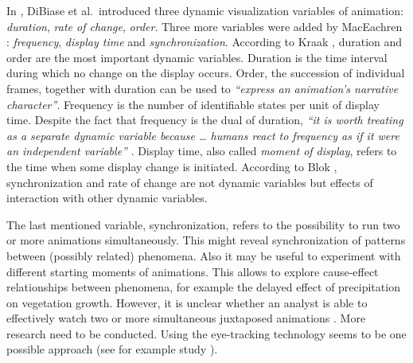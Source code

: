 \documentclass[a4paper,12pt]{book}
\begin{document}

In \cite{dibiase1992animation}, DiBiase et al.\ introduced three dynamic visualization variables of animation:
\emph{duration}, \emph{rate of change}, \emph{order}.
Three more variables were added by MacEachren \cite{maceachren2004maps}:
\emph{frequency}, \emph{display time} and \emph{synchronization}.
According to Kraak \cite{kraak2000visualisation}, duration and order are the most important
dynamic variables. Duration is the time interval during which no change on the display occurs.
Order, the succession of individual frames, together with duration can be used to
\emph{``express an animation's narrative character''}\cite{kraak2000visualisation}.
Frequency is the number of identifiable states per unit of display time.
Despite the fact that frequency is the dual of duration,
\emph{``it is worth treating as a separate dynamic variable because \ldots
humans react to frequency as if it were an independent variable''} \cite{kraak1994visualization}.
Display time, also called \emph{moment of display}, refers to the time when some display change is initiated.
According to Blok  \cite{blok2005dynamic}, synchronization and rate of change are not dynamic variables
but effects of interaction with other dynamic variables.

The last mentioned variable, synchronization, refers to the possibility to run two or more
animations simultaneously. This might reveal synchronization of patterns between (possibly related) phenomena.
Also it may be useful to experiment with different starting moments of animations.
This allows to explore cause-effect relationships between phenomena, for example
the delayed effect of precipitation on vegetation growth.
However, it is unclear whether an analyst is able to effectively watch two or more simultaneous
juxtaposed animations \cite{andrienko2003exploratory}. More research need to be conducted.
Using the eye-tracking technology seems to be one possible approach
(see for example study \cite{opach2011evaluating}).
\end{document}
